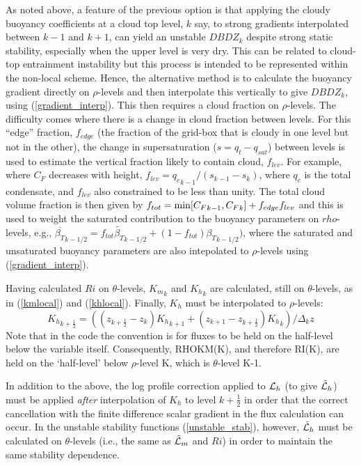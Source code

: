 \documentclass{UMDP_article}
\begin{document}
As noted above, a feature of the previous option is that applying the cloudy 
buoyancy coefficients at a cloud top level, $k$ say, to strong gradients 
interpolated between $k-1$ and $k+1$, can yield an unstable $DBDZ_k$ despite 
strong static stability, especially when the upper level is very dry.  This can be 
related to cloud-top entrainment instability but this process is intended to be 
represented within the non-local scheme.  Hence, the alternative method is to 
calculate the buoyancy gradient directly on $\rho$-levels and then interpolate this 
vertically to give $DBDZ_k$, using (\ref{gradient_interp}).  This then 
requires a cloud fraction on $\rho$-levels.  The difficulty comes where there is 
a change in cloud fraction between levels.  For this ``edge'' fraction, $f_{edge}$ 
(the fraction of the grid-box that is cloudy in one level but not in the other), the 
change in supersaturation ($ s = q_t-q_{sat}$) between 
levels is used to estimate the vertical fraction likely to contain cloud, $f_{lev}$.  
For example, where $C_F$ decreases with height, $f_{lev}={q_c}_{k-1}/(s_{k-1}-s_{k})$, 
where $q_c$ is the total condensate, and $f_{lev}$ also constrained to be less 
than unity.  The total cloud volume fraction 
is then given by $f_{tot} = {\rm min}[{C_F}_{k-1},{C_F}_k] + f_{edge}f_{lev}$ and this 
is used to weight the saturated contribution to the buoyancy parameters on 
$rho$-levels, \mbox{e.g.},
$\overline{\beta_T}_{k-1/2} = f_{tot} \tilde{\beta_T}_{k-1/2} + (1-f_{tot}){\beta_T}_{k-1/2})$,
where the saturated and unsaturated buoyancy parameters are also intepolated to 
$\rho$-levels using (\ref{gradient_interp}).

Having calculated $Ri$ on $\theta$-levels, ${K_m}_{k}$ and ${K_h}_{k}$
are calculated, still on $\theta$-levels, as in (\ref{kmlocal}) and
(\ref{khlocal}).  Finally, $K_h$ must be interpolated to
$\rho$-levels:
\begin{equation*} 
  {K_h}_{k+\frac{1}{2}} = \left(
    (z_{k+\frac{1}{2}}-z_{k}) {K_h}_{k+1} +
    (z_{k+1}-z_{k+\frac{1}{2}}) {K_h}_{k} \right) / \Delta_{k} z
\end{equation*}
Note that in the code the convention is for fluxes to be held on the
half-level below the variable itself.  Consequently, RHOKM(K), and
therefore RI(K), are held on the `half-level' below $\rho$-level K,
which is $\theta$-level K-1.

In addition to the above, the log profile correction applied to ${\cal
  L}_h$ (to give $\tilde{{\cal L}}_h$) must be applied {\em after}
interpolation of $K_h$ to level $k+\frac{1}{2}$ in order that the
correct cancellation with the finite difference scalar gradient in the
flux calculation can occur.  In the unstable stability functions
(\ref{unstable_stab}), however, $\tilde{{\cal L}}_h$ must be
calculated on $\theta$-levels (\mbox{i.e.}, the same as $\tilde{{\cal
    L}}_m$ and $Ri$) in order to maintain the same stability
dependence.
\end{document}
